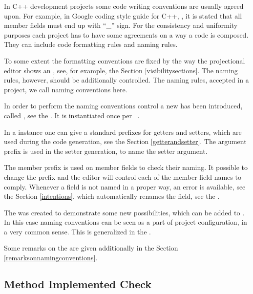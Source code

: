 In C++ development projects some code writing conventions are usually agreed upon. For example, 
in Google coding style guide for C++, \cite{googlecppstyle}, it is stated that all member fields must end up with ``\_'' sign.
For the consistency and uniformity purposes each project has to have some agreements on a way a code is composed.
They can include code formatting rules and naming rules. 

To some extent the formatting conventions are fixed by the way the projectional editor shows an 
, see, for example, the Section \ref{visibilitysections}.
The naming rules, however, should be additionally controlled. The naming rules, accepted in a project, we call 
naming conventions here.

In order to perform the naming conventions control a new  has been introduced, called , see the
. It is instantiated once per \jbmps\ .


In a  instance one can give a standard prefixes for getters and setters, which are used during the code 
generation, see the Section \ref{getterandsetter}. The argument prefix is used in the setter generation, to name the
setter argument.

The member prefix is used on  member fields to check their naming. It possible to change the prefix and the editor will control
each of the member field names to comply. Whenever a field is not named in a proper way, an error  is available, 
see the Section \ref{intentions}, which automatically renames the field, see the .


The   was created to demonstrate some new possibilities, which can be added to \pcpp.
In this case naming conventions can be seen as a part of project configuration, in a very common sense. This is generalized in the
.

Some remarks on the   are given additionally in the Section \ref{remarksonnamingconventions}.


\subsection{Method Implemented Check}
\label{implementedcheck}

